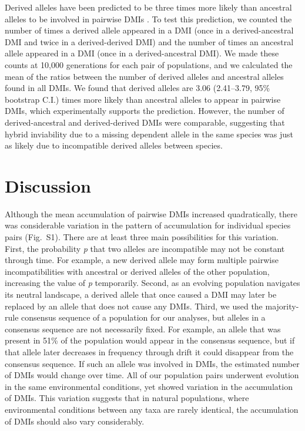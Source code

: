 \begin{doublespace}
Derived alleles have been predicted to be three times more likely
than ancestral alleles to be involved in pairwise DMIs \citep{orr95}.
%
To test this prediction, we counted the number of times
a derived allele appeared in a DMI
(once in a derived-ancestral DMI and twice in a derived-derived DMI)
and the number of times an ancestral allele appeared in a DMI
(once in a derived-ancestral DMI).
%
We made these counts at 10,000 generations for each pair of populations,
and we calculated the mean of the ratios between the number of derived alleles
and ancestral alleles found in all DMIs.
%
We found that derived alleles are 3.06 (2.41--3.79, 95\% bootstrap C.I.)
times more likely than ancestral alleles to appear in pairwise DMIs,
which experimentally supports the prediction.
%
However, the number of derived-ancestral and derived-derived DMIs
were comparable, suggesting that hybrid inviability due to
a missing dependent allele in the same species was just as likely due to
incompatible derived alleles between species.



\section{Discussion}



Although the mean accumulation of pairwise DMIs increased quadratically,
there was considerable variation in the pattern of accumulation
for individual species pairs (Fig.~S1).
%
There are at least three main possibilities for this variation.
%
First, the probability \emph{p} that two alleles are incompatible
may not be constant through time.
%
For example, a new derived allele may form multiple pairwise incompatibilities
with ancestral or derived alleles of the other population,
increasing the value of \emph{p} temporarily.
%
Second, as an evolving population navigates its neutral landscape,
a derived allele that once caused a DMI may later be replaced
by an allele that does not cause any DMIs.
%
Third, we used the majority-rule consensus sequence
of a population for our analyses,
but alleles in a consensus sequence are not necessarily fixed.
%
For example, an allele that was present in 51\% of the population
would appear in the consensus sequence,
but if that allele later decreases in frequency through drift
it could disappear from the consensus sequence.
%
If such an allele was involved in DMIs,
the estimated number of DMIs would change over time.
%
All of our population pairs underwent evolution
in the same environmental conditions,
yet showed variation in the accumulation of DMIs.
%
This variation suggests that in natural populations,
where environmental conditions between any taxa are rarely identical,
the accumulation of DMIs should also vary considerably.



\end{doublespace}
